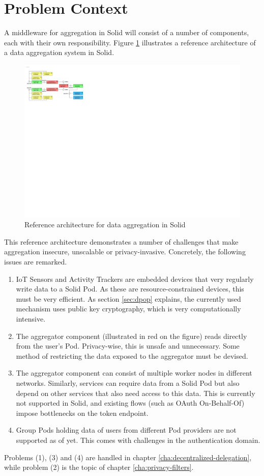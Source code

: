 \section{Problem Context}
\label{sec:problem-context}
A middleware for aggregation in Solid will consist of a number of components, each with their own responsibility. Figure \ref{fig:reference-architecture} illustrates a reference architecture of a data aggregation system in Solid. 

\begin{figure}[h]
    \centering
    \includegraphics[width=1.0\textwidth]{images/architecture/Reference-Architecture-Aggregator.pdf}
    \caption{Reference architecture for data aggregation in Solid}
    \label{fig:reference-architecture}
\end{figure}

\noindent This reference architecture demonstrates a number of challenges that make aggregation insecure, unscalable or privacy-invasive. Concretely, the following issues are remarked.

\begin{enumerate}
    \item IoT Sensors and Activity Trackers are embedded devices that very regularly write data to a Solid Pod. As these are resource-constrained devices, this must be very efficient. As section \ref{sec:dpop} explains, the currently used mechanism uses public key cryptography, which is very computationally intensive.
    \item The aggregator component (illustrated in red on the figure) reads directly from the user's Pod. Privacy-wise, this is unsafe and unnecessary. Some method of restricting the data exposed to the aggregator must be devised.
    \item The aggregator component can consist of multiple worker nodes in different networks. Similarly, services can require data from a Solid Pod but also depend on other services that also need access to this data. This is currently not supported in Solid, and existing flows (such as OAuth On-Behalf-Of) impose bottlenecks on the token endpoint. \item Group Pods holding data of users from different Pod providers are not supported as of yet. This comes with challenges in the authentication domain.
\end{enumerate}

Problems (1), (3) and (4) are handled in chapter \ref{cha:decentralized-delegation}, while problem (2) is the topic of chapter \ref{cha:privacy-filters}.
